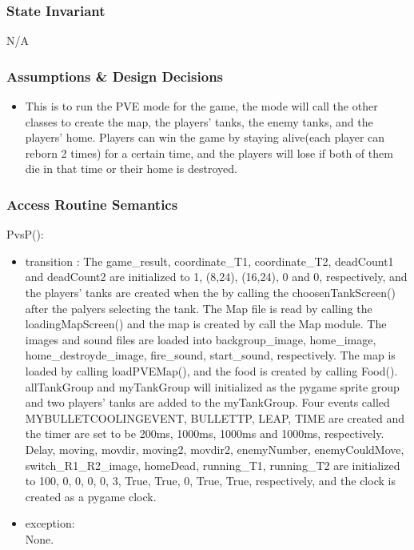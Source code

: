 \documentclass[12pt, titlepage]{article}
\begin{document}
		\subsubsection{State Invariant}
		N/A
		
		\subsubsection{Assumptions \& Design Decisions}
		\begin{itemize}
		\item This is to run the PVE mode for the game, the mode will call the other classes to create the map, the players' tanks, the enemy tanks, and the players' home. Players can win the game by staying alive(each player can reborn 2 times) for a certain time, and the players will lose if both of them die in that time or their home is destroyed.
		\end{itemize}
		\subsubsection{Access Routine Semantics}
        PvsP():
		\begin{itemize}
		\item transition : The game\_result, coordinate\_T1, coordinate\_T2, deadCount1 and deadCount2 are initialized to 1, (8,24), (16,24), 0 and 0, respectively, and the players' tanks are created when the by calling the choosenTankScreen() after the palyers selecting the tank. The Map file is read by calling the loadingMapScreen() and the map is created by call the Map module. The images and sound files are loaded into backgroup\_image, home\_image, home\_destroyde\_image, fire\_sound, start\_sound, respectively. The map is loaded by calling loadPVEMap(), and the food is created by calling Food(). allTankGroup and myTankGroup will initialized as the pygame sprite group and two players' tanks are added to the myTankGroup. Four events called MYBULLETCOOLINGEVENT, BULLETTP, LEAP, TIME are created and the timer are set to be 200ms, 1000ms, 1000ms and 1000ms, respectively. Delay, moving, movdir, moving2, movdir2, enemyNumber, enemyCouldMove, switch\_R1\_R2\_image, homeDead, running\_T1, running\_T2 are initialized to 100, 0, 0, 0, 0, 3, True, True, 0, True, True, respectively, and the clock is created as a pygame clock.
		
		\item exception:\\None.
		\end{itemize}
\end{document}
